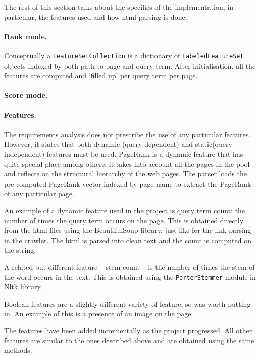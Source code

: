 \documentclass[12pt,notitlepage,twoside]{scrreprt}
\begin{document}
The rest of this section talks about the specifics of the implementation, in
particular, the features used and how html parsing is done.

\paragraph{Rank mode.}
Conceptually a \texttt{FeatureSetCollection} is a dictionary of \texttt{LabeledFeatureSet}
objects indexed by both path to page and  query term. After initialisation, all
the features are computed and `filled up' per query term per page.

\paragraph{Score mode.}
\paragraph{Features.}


The requirements analysis does not prescribe the use of any particular
features. However, it states that both dynamic (query dependent) and
static(query independent) features must be used. PageRank is a dynamic feature
that has quite special place among others: it takes into account all the pages
in the pool and reflects on the structural hierarchy of the web pages. 
The parser loads the pre-computed PageRank vector indexed by page name to
extract the PageRank of any particular page.

An example of a dynamic feature used in the project is query term count: the
number of times the query term occurs on the page. This is obtained directly
from the html files using the BeautifulSoup library, just like for the link
parsing in the crawler. The html is parsed into clean text and the count is
computed on the string.

A related but different feature -- stem count -- is the number of times the
stem of the word occurs in the text. This is obtained using the \texttt{PorterStemmer}
module in Nltk library.

Boolean features are a slightly different variety of feature, so was worth
putting in. An example of this is a presence of an image on the page.

The features have been added incrementally as the project progressed. All other
features are similar to the ones described above and are obtained using the
same methods.
\end{document}
